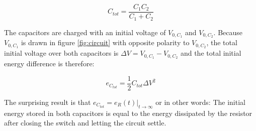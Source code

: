 \begin{equation}
    C_{tot} = \frac{C_1C_2}{C_1+C_2}
\end{equation}

The capacitors are charged with an initial voltage of $V_{0,C_1}$ and $V_{0,C_2}$. Because $V_{0,C_1}$ is drawn in figure \ref{fig:circuit} with opposite polarity to $V_{0,C_2}$, the total initial voltage over both capacitors is $\Delta V = V_{0,C_1} - V_{0,C_2}$ and the total initial energy difference is therefore:

\begin{equation}
    e_{C_{tot}} = \frac{1}{2} C_{tot} {\Delta V}^2
\end{equation}

The surprising result is that $e_{C_{tot}} = e_R(t)\bigg|_{t\to\infty}$ or in other words: The initial energy stored in both capacitors is equal to the energy dissipated by the resistor after closing the switch and letting the circuit settle.

